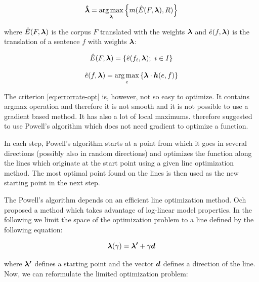 \begin{equation}
  \boldsymbol{\hat\lambda} = \operatorname*{arg\,max}_{\boldsymbol{\lambda}} \left\{ m( \hat{E}(F,
  \boldsymbol{\lambda}), R ) \right\}
    \label{eq:errorrate-opt}
\end{equation}

\noindent where $\hat{E}(F, \boldsymbol{\lambda})$ is the corpus $F$ translated with
the weights $\boldsymbol{\lambda}$ and $\hat{e}(f, \boldsymbol{\lambda})$ is the
translation of a sentence $f$ with weights $\boldsymbol{\lambda}$:

\begin{equation}
  \hat{E}(F, \boldsymbol{\lambda}) = \left\{ \hat{e}(f_i, \boldsymbol{\lambda});~i \in I\right\}
    \label{eq:corpus-translation}
\end{equation}

\begin{equation}
  \hat{e}(f, \boldsymbol{\lambda}) = 
    \operatorname*{arg\,max}_{e} \left\{ \boldsymbol{\lambda} \cdot \boldsymbol{h}(e, f) \right\}
    \label{eq:sentence-translation}
\end{equation}

The criterion \eqref{eq:errorrate-opt} is, however, not so easy to optimize. It
contains argmax operation and therefore it is not smooth and it is not possible
to use a gradient based method. It has also a lot of local maximums.
 therefore suggested to use Powell's algorithm
 which does not need gradient to optimize a function.

In each step, Powell's algorithm starts at a point from which it goes in
several directions (possibly also in random directions) and optimizes the
function along the lines which originate at the start point using a given line
optimization method. The most optimal point found on the lines is then used as
the new starting point in the next step. 

The Powell's algorithm depends on an efficient line optimization method. Och
proposed a method which takes advantage of log-linear model properties. In the
following we limit the space of the optimization problem to a line defined by
the following equation:

\begin{equation}
  \boldsymbol{\lambda}(\gamma) = \boldsymbol{\lambda'} + \gamma \boldsymbol{d}
  \label{eq:line}
\end{equation}

\noindent where $\boldsymbol{\lambda'}$ defines a starting point and the vector
$\boldsymbol{d}$ defines a direction of the line. Now, we can reformulate the limited
optimization problem:

